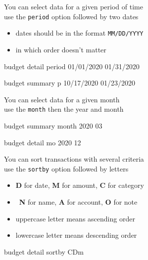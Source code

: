 \documentclass[12pt,letterpaper]{article}
\begin{document}
\begin{framed}
    \begin{minipage}[t][3in][t]{5in}
        \Large
        You can select data for a given period of time\\

        use the \lstinline[language=budget,basicstyle=\Large]!period! option followed by two dates
                \begin{itemize}
                    \item dates should be in the format \texttt{MM/DD/YYYY}
                    \item in which order doesn't matter
                \end{itemize}
                \begin{budget}
                    budget detail period 01/01/2020 01/31/2020

                    budget summary p 10/17/2020 01/23/2020 
                \end{budget}
    \end{minipage}
\end{framed}
\begin{framed}
    \begin{minipage}[t][3in][t]{5in}
        \Large
        You can select data for a given month\\

        use the \lstinline[language=budget,basicstyle=\Large]!month! then the year and month\\
        \begin{budget}
                    budget summary month 2020 03

                    budget detail mo 2020 12
                \end{budget}
    \end{minipage}
\end{framed}
\begin{framed}
    \begin{minipage}[t][3in][t]{5in}
        \Large
        You can sort transactions with several criteria\\

        use the \lstinline[language=budget,basicstyle=\Large]!sortby! option followed by letters
        \begin{itemize}
            \item \textbf{D} for date, \textbf{M} for amount, \textbf{C} for category
                \item \textbf{N} for name, \textbf{A} for account, \textbf{O} for note
            \item uppercase letter means ascending order
            \item lowercase letter means descending order
        \end{itemize}
        \begin{budget}
            budget detail sortby CDm
                \end{budget}
    \end{minipage}
\end{framed}
\end{document}

